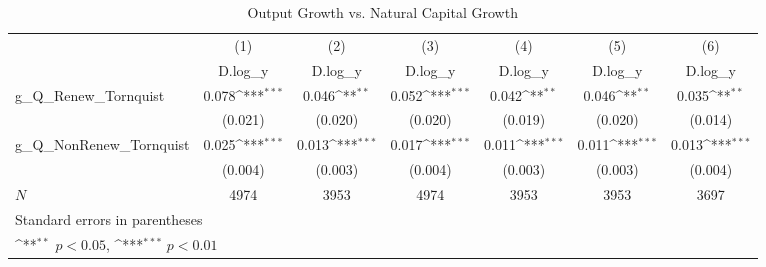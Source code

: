 \begin{table}[htbp]\centering
\def\sym#1{\ifmmode^{#1}\else\(^{#1}\)\fi}
\caption{Output Growth vs. Natural Capital Growth}
\begin{tabular}{l*{6}{c}}
\hline\hline
            &\multicolumn{1}{c}{(1)}&\multicolumn{1}{c}{(2)}&\multicolumn{1}{c}{(3)}&\multicolumn{1}{c}{(4)}&\multicolumn{1}{c}{(5)}&\multicolumn{1}{c}{(6)}\\
            &\multicolumn{1}{c}{D.log\_y}&\multicolumn{1}{c}{D.log\_y}&\multicolumn{1}{c}{D.log\_y}&\multicolumn{1}{c}{D.log\_y}&\multicolumn{1}{c}{D.log\_y}&\multicolumn{1}{c}{D.log\_y}\\
\hline
g\_Q\_Renew\_Tornquist&       0.078\sym{***}&       0.046\sym{**} &       0.052\sym{***}&       0.042\sym{**} &       0.046\sym{**} &       0.035\sym{**} \\
            &     (0.021)         &     (0.020)         &     (0.020)         &     (0.019)         &     (0.020)         &     (0.014)         \\
[1em]
g\_Q\_NonRenew\_Tornquist&       0.025\sym{***}&       0.013\sym{***}&       0.017\sym{***}&       0.011\sym{***}&       0.011\sym{***}&       0.013\sym{***}\\
            &     (0.004)         &     (0.003)         &     (0.004)         &     (0.003)         &     (0.003)         &     (0.004)         \\
\hline
\(N\)       &        4974         &        3953         &        4974         &        3953         &        3953         &        3697         \\
\hline\hline
\multicolumn{7}{l}{\footnotesize Standard errors in parentheses}\\
\multicolumn{7}{l}{\footnotesize \sym{**} \(p<0.05\), \sym{***} \(p<0.01\)}\\
\end{tabular}
\end{table}
